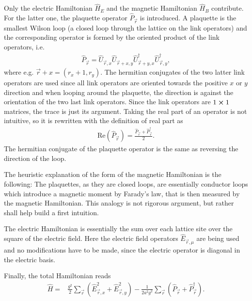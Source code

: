 Only the electric Hamiltonian $\hat{H}_E$ and the magnetic Hamiltonian $\hat{H}_B$ contribute. For the latter one, the plaquette operator $\hat{P}_{\vec{r}}$ is introduced. A plaquette is the smallest Wilson loop (a closed loop through the lattice on the link operators) and the corresponding operator is formed by the oriented product of the link operators, i.e.
\begin{align}
	\hat{P}_{\vec{r}}=\hat{U}_{\vec{r}, x}\hat{U}_{\vec{r}+x,y}\hat{U}^{\dag}_{\vec{r}+y,x}\hat{U}^{\dag}_{\vec{r},y},
\end{align}
where e.g. $\vec{r}+x=(r_x+1,r_y)$. The hermitian conjugates of the two latter link operators are used since all link operators are oriented towards the positive $x$ or $y$ direction and when looping around the plaquette, the direction is against the orientation of the two last link operators. Since the link operators are $1\cross1$ matrices, the trace is just its argument. Taking the real part of an operator is not intuitive, so it is rewritten with the definition of real part as 
\begin{align}
  \text{Re}(\hat{P}_{\vec{r}})=\frac{\hat{P}_{\vec{r}}+\hat{P}_{\vec{r}}^{\dag}}{2}.
\end{align}
The hermitian conjugate of the plaquette operator is the same as reversing the direction of the loop.

The heuristic explanation of the form of the magnetic Hamiltonian is the following: The plaquettes, as they are closed loops, are essentially conductor loops which introduce a magnetic moment by Farady's law, that is then measured by the magnetic Hamiltonian. This analogy is not rigorous argument, but rather shall help build a first intuition.

The electric Hamiltonian is essentially the sum over each lattice site over the square of the electric field. Here the electric field operators $\hat{E}_{\vec{r},\mu}$ are being used and no modifications have to be made, since the electric operator is diagonal in the electric basis.

Finally, the total Hamiltonian reads
\begin{align*}
  \hat{H} = & \frac{g^2}{2}\sum_{\vec{r}}\left(\hat{E}_{\vec{r}, x}^2+\hat{E}_{\vec{r}, y}^2\right)-\frac{1}{2a^2g^2}\sum_{\vec{r}}\left(\hat{P}_{\vec{r}}+\hat{P}_{\vec{r}}^{\dag}\right).
\end{align*}
  
